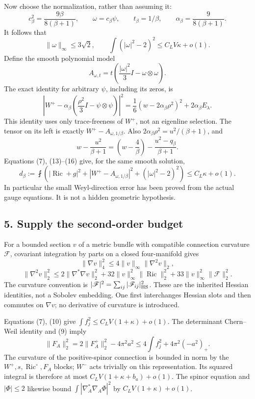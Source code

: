 \documentclass[
  10pt,
]{article}
\begin{document}
Now choose the normalization, rather than assuming it: \[
c_\beta^2=\frac{9\beta}{8(\beta+1)},\qquad
\omega=c_\beta\psi,\qquad t_\beta=1/\beta,\qquad
\alpha_\beta=\frac9{8(\beta+1)}.
\] It follows that \[
\|\omega\|_\infty\le3\sqrt2,\qquad
\int(|\omega|^2-2)^2\le C_L V\kappa+o(1).
\tag{15}
\] Define the smooth polynomial model \[
A_{\omega,t}=t\left(\frac{|\omega|^2}{3}I-\omega\otimes\omega\right).
\] The exact identity for arbitrary \(\psi\), including its zeros, is \[
\left|W^+-\alpha_\beta
       \left(\frac{\rho^2}{3}I-\psi\otimes\psi\right)\right|^2
=\frac16(w-2\alpha_\beta\rho^2)^2
+2\alpha_\beta E_\lambda.
\tag{16}
\] This identity uses only trace-freeness of \(W^+\), not an eigenline
selection. The tensor on its left is exactly \(W^+-A_{\omega,1/\beta}\).
Also \(2\alpha_\beta\rho^2=u^2/(\beta+1)\), and \[
w-\frac{u^2}{\beta+1}
=\left(w-\frac4\beta\right)
-\frac{u^2-q_\beta}{\beta+1}.
\] Equations (7), (13)--(16) give, for the same smooth solution, \[
d_\beta:=\fint\left(
 |\operatorname{Ric}+g|^2+|W^+-A_{\omega,1/\beta}|^2
+(|\omega|^2-2)^2\right)
\le C_L\kappa+o(1).
\tag{17}
\] In particular the small Weyl-direction error has been proved from the
actual gauge equations. It is not a hidden geometric hypothesis.

\hypertarget{supply-the-second-order-budget}{%
\subsection{5. Supply the second-order
budget}\label{supply-the-second-order-budget}}

For a bounded section \(v\) of a metric bundle with compatible
connection curvature \(\mathscr F\), covariant integration by parts on a
closed four-manifold gives \[
\|\nabla v\|_4^2\le4\|v\|_\infty\|\nabla^2v\|_2,
\] \[
\|\nabla^2v\|_2^2
\le2\|\nabla^*\nabla v\|_2^2
+32\|v\|_\infty^2\|\operatorname{Ric}\|_2^2
+33\|v\|_\infty^2\|\mathscr F\|_2^2.
\tag{18}
\] The curvature convention is
\(|\mathscr F|^2=\sum_{ij} |\mathscr F_{ij}|_{\rm HS}^2\). These are the
inherited Hessian identities, not a Sobolev embedding. One first
interchanges Hessian slots and then commutes on \(\nabla v\); no
derivative of curvature is introduced.

Equations (7), (10) give \(\int f_j^2\le C_L V(1+\kappa)+o(1)\). The
determinant Chern--Weil identity and (9) imply \[
\|F_A\|_2^2=2\|F_A^+\|_2^2-4\pi^2a^2
\le4\int f_j^2+4\pi^2(-a^2)_+.
\] The curvature of the positive-spinor connection is bounded in norm by
the \(W^+,s,\operatorname{Ric}^{\circ},F_A\) blocks; \(W^-\) acts
trivially on this representation. Its squared integral is therefore at
most \(C_LV(1+\kappa+b_a)+o(1)\). The spinor equation and \(|\Phi|\le2\)
likewise bound \(\int|\nabla_A^*\nabla_A\Phi|^2\) by
\(C_LV(1+\kappa)+o(1)\).
\end{document}
